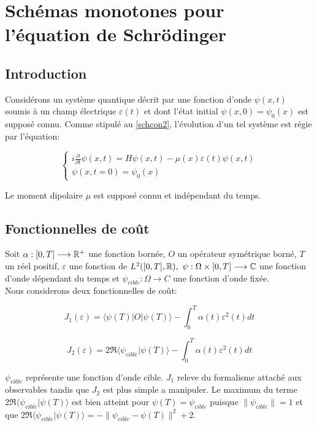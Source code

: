\chapter{Schémas monotones pour l'équation de Schrödinger}

\section{Introduction}

Considérons un système quantique décrit par une fonction d’onde $\psi(x, t)$ soumis à un champ électrique $\varepsilon(t)$ et dont l’état initial $\psi(x, 0) = \psi_0 (x)$ est supposé connu. Comme stipulé au \eqref{schcon2}, l’évolution d’un tel système est régie par l’équation:

\begin{equation}
\begin{cases}
i \frac{\partial}{\partial t} \psi (x,t) = H\psi(x,t) - \mu(x)\varepsilon(t)\psi(x,t)\\
\psi(x,t=0)=\psi_0(x)
\end{cases}
\end{equation}

Le moment dipolaire $\mu$ est supposé connu et indépendant du temps.

\section{Fonctionnelles de coût}
Soit $\alpha : [0, T ] \longrightarrow \mathbb R^+$ une fonction bornée, $O$ un opérateur symétrique borné, $T$ un réel positif, $\varepsilon$ une fonction de $L^2 ([0, T ], \mathbb R),\  \psi : \Omega \times [0, T ] \longrightarrow \mathbb C$ une fonction d’onde dépendant du temps et $\psi_{cible} : \Omega \longrightarrow C$ une fonction d’onde fixée.
\\Nous considerons deux fonctionnelles de coût:

\begin{equation}
J_1(\varepsilon) = \langle \psi(T)|O|\psi(T) \rangle - \int_0^T \alpha(t)\varepsilon^2(t)dt
\end{equation}

\begin{equation}
J_2(\varepsilon) = 2\Re\langle \psi_{cible}|\psi(T)\rangle - \int_0^T \alpha(t)\varepsilon^2(t)dt
\end{equation}

$\psi_{cible}$ représente une fonction d’onde cible. $J_1$ releve du formalisme attaché aux observables tandis que $J_2$ est plus simple a manipuler.
Le maximum du terme $2\Re\langle \psi_{cible}|\psi(T)\rangle$ est bien atteint pour $\psi(T) = \psi_{cible}$ puisque $\lVert \psi_{cible} \rVert = 1$ et que $2\Re\langle \psi_{cible}|\psi(T)\rangle = -\lVert \psi_{cible} - \psi(T)\rVert ^2+2$.

